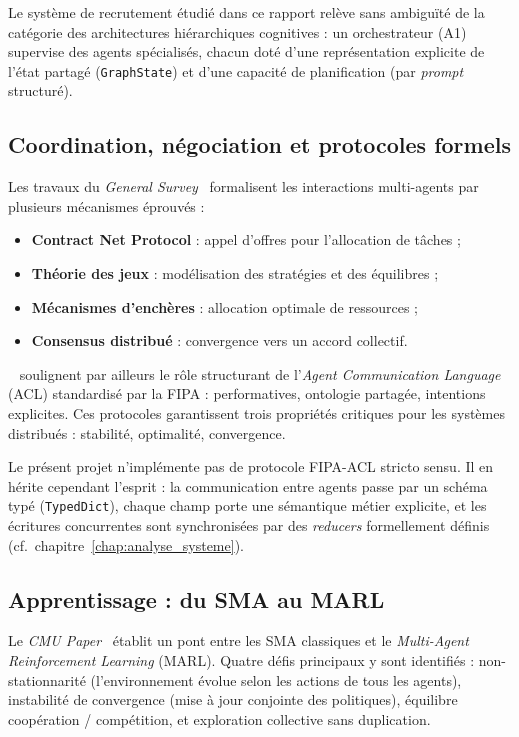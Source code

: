 Le système de recrutement étudié dans ce rapport relève sans ambiguïté de la catégorie des architectures hiérarchiques cognitives : un orchestrateur (A1) supervise des agents spécialisés, chacun doté d'une représentation explicite de l'état partagé (\texttt{GraphState}) et d'une capacité de planification (par \emph{prompt} structuré).

\subsection{Coordination, négociation et protocoles formels}

Les travaux du \emph{General Survey}~\cite{sma_general_survey} formalisent les interactions multi-agents par plusieurs mécanismes éprouvés :

\begin{itemize}[leftmargin=1cm]
\item \textbf{Contract Net Protocol} : appel d'offres pour l'allocation de tâches ;
\item \textbf{Théorie des jeux} : modélisation des stratégies et des équilibres ;
\item \textbf{Mécanismes d'enchères} : allocation optimale de ressources ;
\item \textbf{Consensus distribué} : convergence vers un accord collectif.
\end{itemize}

\citeauthor{dorri2018mas}~\cite{dorri2018mas} soulignent par ailleurs le rôle structurant de l'\emph{Agent Communication Language} (ACL) standardisé par la FIPA \cite{fipa_acl} : performatives, ontologie partagée, intentions explicites. Ces protocoles garantissent trois propriétés critiques pour les systèmes distribués : stabilité, optimalité, convergence.

Le présent projet n'implémente pas de protocole FIPA-ACL stricto sensu. Il en hérite cependant l'esprit : la communication entre agents passe par un schéma typé (\texttt{TypedDict}), chaque champ porte une sémantique métier explicite, et les écritures concurrentes sont synchronisées par des \emph{reducers} formellement définis (cf.\ chapitre~\ref{chap:analyse_systeme}).

\subsection{Apprentissage : du SMA au MARL}

Le \emph{CMU Paper}~\cite{sma_cmu_marl} établit un pont entre les SMA classiques et le \emph{Multi-Agent Reinforcement Learning} (MARL). Quatre défis principaux y sont identifiés : non-stationnarité (l'environnement évolue selon les actions de tous les agents), instabilité de convergence (mise à jour conjointe des politiques), équilibre coopération / compétition, et exploration collective sans duplication.

